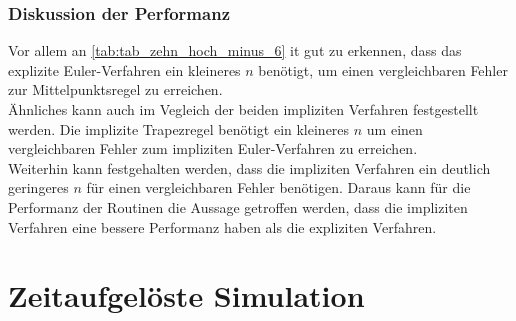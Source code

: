 \documentclass[
	pagesize,
	fontsize=12pt,
	paper=a4,
	oneside,
   reqno
]{scrartcl}
\begin{document}
\begin{table}[H]
   \centering
   \caption[$n$-Bestimmung bei max. abs. Fehler von $10^{-6}$]{Experimentelle Bestimmung von $n$ bei einem maximalen Fehler von $10^{-6}$}
   \label{tab:tab_zehn_hoch_minus_6}
\end{table}

\subsubsection{Diskussion der Performanz}

Vor allem an \autoref{tab:tab_zehn_hoch_minus_6} it gut zu erkennen, dass das explizite Euler-Verfahren ein kleineres $n$  benötigt, um einen vergleichbaren Fehler zur Mittelpunktsregel zu erreichen. \\
Ähnliches kann auch im Vegleich der beiden impliziten Verfahren festgestellt werden. Die implizite Trapezregel benötigt ein kleineres $n$ um einen vergleichbaren Fehler zum impliziten Euler-Verfahren zu erreichen. \\
Weiterhin kann festgehalten werden, dass die impliziten Verfahren ein deutlich geringeres $n$ für einen vergleichbaren Fehler benötigen. Daraus kann für die Performanz der Routinen die Aussage getroffen werden, dass die impliziten Verfahren eine bessere Performanz haben als die expliziten Verfahren.

\clearpage

\section{Zeitaufgelöste Simulation} \label{sec:ZeitaufgeloesteSimulation}
\end{document}
